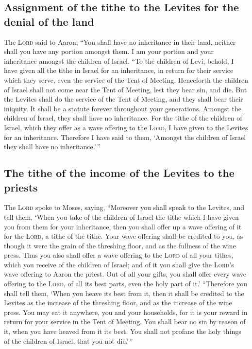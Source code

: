 \hypertarget{assignment-of-the-tithe-to-the-levites-for-the-denial-of-the-land}{%
\subsection{Assignment of the tithe to the Levites for the denial of the
land}\label{assignment-of-the-tithe-to-the-levites-for-the-denial-of-the-land}}

 The \textsc{Lord} said to Aaron, ``You shall have no
inheritance in their land, neither shall you have any portion amongst
them. I am your portion and your inheritance amongst the children of
Israel.  ``To the children of Levi, behold, I have given
all the tithe in Israel for an inheritance, in return for their service
which they serve, even the service of the Tent of Meeting.
 Henceforth the children of Israel shall not come near
the Tent of Meeting, lest they bear sin, and die.  But
the Levites shall do the service of the Tent of Meeting, and they shall
bear their iniquity. It shall be a statute forever throughout your
generations. Amongst the children of Israel, they shall have no
inheritance.  For the tithe of the children of Israel,
which they offer as a wave offering to the \textsc{Lord}, I have given
to the Levites for an inheritance. Therefore I have said to them,
`Amongst the children of Israel they shall have no inheritance.'\,''

\hypertarget{the-tithe-of-the-income-of-the-levites-to-the-priests}{%
\subsection{The tithe of the income of the Levites to the
priests}\label{the-tithe-of-the-income-of-the-levites-to-the-priests}}

 The \textsc{Lord} spoke to Moses, saying,
 ``Moreover you shall speak to the Levites, and tell
them, `When you take of the children of Israel the tithe which I have
given you from them for your inheritance, then you shall offer up a wave
offering of it for the \textsc{Lord}, a tithe of the tithe.
 Your wave offering shall be credited to you, as though
it were the grain of the threshing floor, and as the fullness of the
wine press.  Thus you also shall offer a wave offering to
the \textsc{Lord} of all your tithes, which you receive of the children
of Israel; and of it you shall give the \textsc{Lord}'s wave offering to
Aaron the priest.  Out of all your gifts, you shall offer
every wave offering to the \textsc{Lord}, of all its best parts, even
the holy part of it.'  ``Therefore you shall tell them,
`When you heave its best from it, then it shall be credited to the
Levites as the increase of the threshing floor, and as the increase of
the wine press.  You may eat it anywhere, you and your
households, for it is your reward in return for your service in the Tent
of Meeting.  You shall bear no sin by reason of it, when
you have heaved from it its best. You shall not profane the holy things
of the children of Israel, that you not die.'\,''

